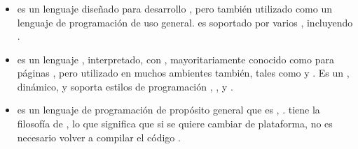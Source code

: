 	\subsubsection{\serverSideAS \scriptingLanguagePL}
		\begin{itemize}
			\item
				\textbf{\phpNAME} es un lenguaje \scripting \serverSideAS diseñado para desarrollo \webINT, pero también utilizado como un lenguaje de programación de uso general\cite{online_technology_php}. \phpNAME es soportado por varios \webserverINT, incluyendo \apacheNAME \httpNAME \serverAS.

			\item
				\textbf{\javaScriptNAME} es un lenguaje \lightweightPL, interpretado, \objectOrientedPL con \firstClassFuncPL, mayoritariamente conocido como \scriptingLanguagePL para páginas \webINT, pero utilizado en muchos ambientes \nonBrowserINT también, tales como \nodejsNAME y \apacheNAME \couchdbNAME. Es un \scriptingLanguagePL \prototypeBasedPL, \multiParadigmPL dinámico, y soporta estilos de programación \objectOrientedPL, \imperativePL, y \functionalPL \cite{online_technology_mozilla_javascript}. 
			\item
				\textbf{\javaNAME} es un lenguaje de programación de propósito general que es \objectOrientedPL, \concurrentPL \classBasedPL \cite{online_technology_mozilla_javascript}. \javaNAME tiene la filosofía de \writeOnceRunAnyPL, lo que significa que si se quiere cambiar de plataforma, no es necesario volver a compilar el código \cite{online_java_write_once}.


\end{itemize}
